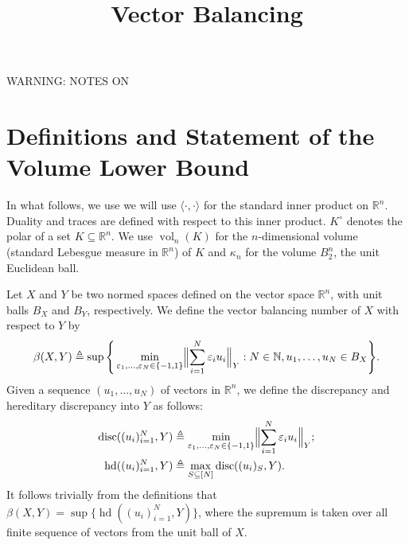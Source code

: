\documentclass{article}
\newcommand{\R}{{\mathbb{R}}}
\newcommand{\T}{\mathsf T}
\newcommand\eps{\varepsilon}
\newcommand{\eqdef}{\triangleq}
\newcommand{\inner}[2]{\langle #1, #2 \rangle}
\DeclareMathOperator{\vollb}{volLB}
\DeclareMathOperator{\disc}{disc}
\DeclareMathOperator{\hd}{hd}
\DeclareMathOperator{\detb}{|det|}
\DeclareMathOperator{\vol}{vol}
\DeclareMathOperator{\lspan}{span}
\newcommand{\noteswarning}{{\begin{center} {\Large WARNING: NOTES ON}\end{center}}}
\newcommand{\noteswarning}{{}}
\begin{document}
\title{Vector Balancing}
\maketitle

\noteswarning


\section{Definitions and Statement of the Volume Lower Bound}

In what follows, we use we will use $\inner{\cdot}{\cdot}$
for the standard inner product on $\R^n$. Duality and traces are
defined with respect to this inner product. $K^\circ$ denotes the
polar of a set $K \subseteq \R^n$. We use $\vol_n(K)$ for the
$n$-dimensional volume (standard Lebesgue measure in $\R^n$) of $K$ and
$\kappa_n$ for the volume $B_2^n$, the unit Euclidean ball.

Let $X$ and $Y$ be two normed spaces defined on the vector space
$\R^n$, with unit balls $B_X$ and $B_Y$, respectively. We define
the vector balancing number of $X$ with respect to $Y$ by
\[
\beta(X, Y) \eqdef \sup\Bigg\{ 
\min_{\eps_1, \ldots,\eps_N \in \{-1, 1\}} \Bigl\|\sum_{i = 1}^N{\eps_i u_i}\Bigr\|_{Y}: N \in \mathbb{N},
u_1, \ldots, u_N \in B_X\Bigg\}.
\]
Given a sequence $(u_1, \ldots, u_N)$ of vectors in $\R^n$, we define the
discrepancy and hereditary discrepancy into $Y$ as follows:
\begin{align*}
\disc((u_i)_{i = 1}^N,Y) &\eqdef \min_{\eps_1, \ldots,\eps_N \in
  \{-1, 1\}}
\Bigl\|\sum_{i = 1}^N{\eps_i u_i}\Bigr\|_{Y};\\
\hd((u_i)_{i = 1}^N, Y) &\eqdef \max_{S \subseteq  [N]}{\disc((u_i)_S, Y)}.
\end{align*}
It follows trivially from the definitions that $\beta(X, Y) =
\sup\{\hd((u_i)_{i = 1}^N, Y)\}$, where the supremum is taken over all
finite sequence of vectors from the unit ball of $X$.

\end{document}
